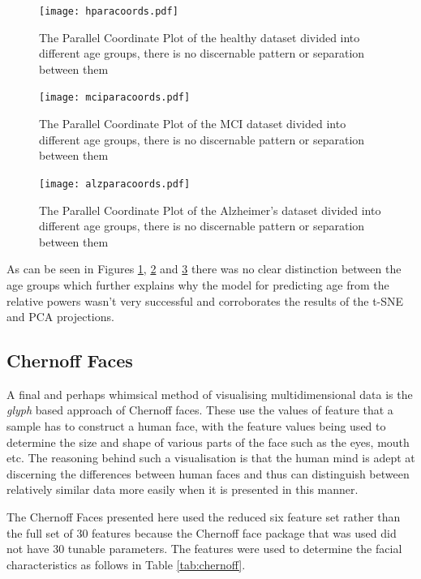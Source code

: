 \begin{figure}[h]
  \centering
    \texttt{[image: hparacoords.pdf]}
    \caption{The Parallel Coordinate Plot of the healthy dataset divided into different age groups, there is no discernable pattern or separation between them}
    \label{fig:hparacoords}
\end{figure}


\begin{figure}[h]
  \centering
    \texttt{[image: mciparacoords.pdf]}
    \caption{The Parallel Coordinate Plot of the MCI dataset divided into different age groups, there is no discernable pattern or separation between them}
    \label{fig:mciparacoords}
\end{figure}


\begin{figure}[h]
  \centering
    \texttt{[image: alzparacoords.pdf]}
    \caption{The Parallel Coordinate Plot of the Alzheimer's dataset divided into different age groups, there is no discernable pattern or separation between them}
    \label{fig:alzparacoords}
\end{figure}

As can be seen in Figures \ref{fig:hparacoords}, \ref{fig:mciparacoords} and \ref{fig:alzparacoords} there was no clear distinction between the age groups which further explains why the model for predicting age from the relative powers wasn't very successful and corroborates the results of the t-SNE and PCA projections.

\clearpage
\subsection{Chernoff Faces}

A final and perhaps whimsical method of visualising multidimensional data is the \textit{glyph} based approach of Chernoff faces. These use the values of feature that a sample has to construct a human face, with the feature values being used to determine the size and shape of various parts of the face such as the eyes, mouth etc. The reasoning behind such a visualisation is that the human mind is adept at discerning the differences between human faces and thus can distinguish between relatively similar data more easily when it is presented in this manner. \cite{Chernoff1973}

The Chernoff Faces presented here used the reduced six feature set rather than the full set of 30 features because the Chernoff face package that was used did not have 30 tunable parameters. The features were used to determine the facial characteristics as follows in Table \ref{tab:chernoff}.


